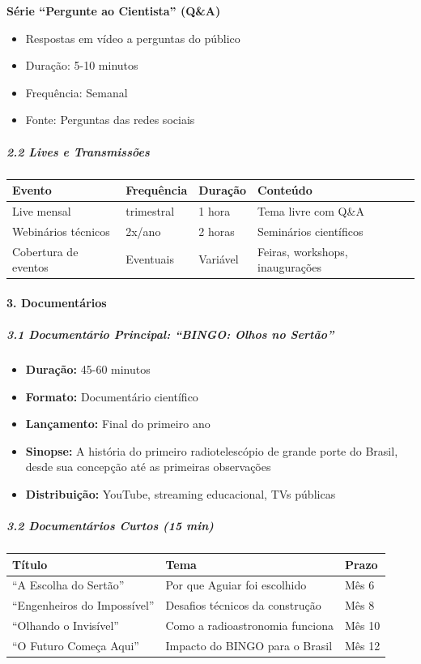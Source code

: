 \textbf{Série ``Pergunte ao Cientista'' (Q\&A)}

\begin{itemize}
\item Respostas em vídeo a perguntas do público
\item Duração: 5-10 minutos
\item Frequência: Semanal
\item Fonte: Perguntas das redes sociais
\end{itemize}

\subparagraph{2.2 Lives e Transmissões}

\bigskip\noindent
\begin{tabular}{p{}p{}p{}p{}}
\toprule
Evento & Frequência & Duração & Conteúdo \\
\hline
Live mensal & trimestral & 1 hora & Tema livre com Q\&A \\
Webinários técnicos & 2x/ano & 2 horas & Seminários científicos \\
Cobertura de eventos & Eventuais & Variável & Feiras, workshops, inaugurações \\
\bottomrule
\end{tabular}

\bigskip

\paragraph{3. Documentários}

\subparagraph{3.1 Documentário Principal: ``BINGO: Olhos no Sertão''}

\begin{itemize}
\item \textbf{Duração:} 45-60 minutos
\item \textbf{Formato:} Documentário científico
\item \textbf{Lançamento:} Final do primeiro ano
\item \textbf{Sinopse:} A história do primeiro radiotelescópio de grande porte do Brasil, desde sua concepção até as primeiras observações
\item \textbf{Distribuição:} YouTube, streaming educacional, TVs públicas
\end{itemize}

\subparagraph{3.2 Documentários Curtos (15 min)}

\bigskip\noindent
\begin{tabular}{p{}p{}p{}}
\toprule
Título & Tema & Prazo \\
\hline
``A Escolha do Sertão'' & Por que Aguiar foi escolhido & Mês 6 \\
``Engenheiros do Impossível'' & Desafios técnicos da construção & Mês 8 \\
``Olhando o Invisível'' & Como a radioastronomia funciona & Mês 10 \\
``O Futuro Começa Aqui'' & Impacto do BINGO para o Brasil & Mês 12 \\
\bottomrule
\end{tabular}

